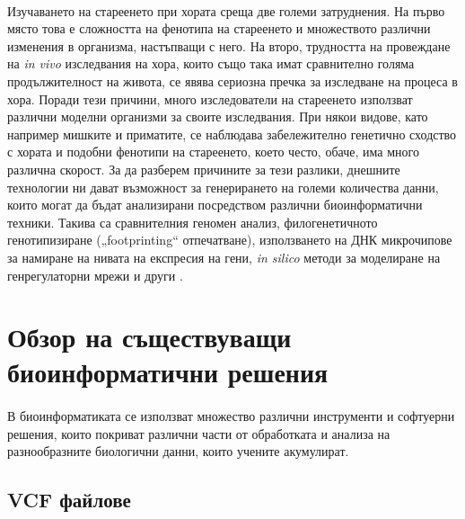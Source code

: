 \documentclass[pdftex,cyrillic,14pt,a4page,twoside,openright]{extreport}
\begin{document}
\paragraph{}
Изучаването на стареенето при хората среща две големи затруднения. На първо място това е сложността на фенотипа на стареенето и множеството различни изменения в организма, настъпващи с него. На второ, трудността на провеждане на \textit{in vivo} изследвания на хора, които също така имат сравнително голяма продължителност на живота, се явява сериозна пречка за изследване на процеса в хора. Поради тези причини, много изследователи на стареенето използват различни моделни организми за своите изследвания. При някои видове, като например мишките и приматите, се наблюдава забележително генетично сходство с хората и подобни фенотипи на стареенето, което често, обаче, има много различна скорост. За да разберем причините за тези разлики, днешните технологии ни дават възможност за генерирането на големи количества данни, които могат да бъдат анализирани посредством различни биоинформатични техники. Такива са сравнителния геномен анализ, филогенетичното генотипизиране („footprinting“ отпечатване), използването на ДНК микрочипове за намиране на нивата на експресия на гени, \textit{in silico} методи за моделиране на генрегулаторни мрежи и други \cite{demagalhaes2004}.
 
\section[Обзор на съществуващи биоинформатични решения]{Обзор на съществуващи\\ биоинформатични решения}
\paragraph{}
В биоинформатиката се използват множество различни инструменти и софтуерни решения, които покриват различни части от обработката и анализа на разнообразните биологични данни, които учените акумулират.

\subsection{VCF файлове}
\end{document}
